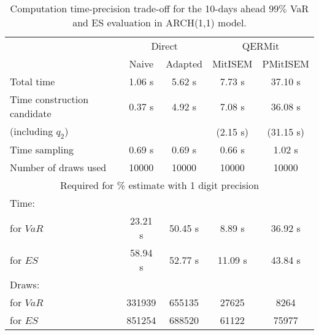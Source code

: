{ \renewcommand{\arraystretch}{1.3} 
\begin{table}[h] 
\centering 
\caption{Computation time-precision trade-off for the 10-days ahead  $99\%$ VaR and ES evaluation in ARCH(1,1) model.} 
\label{tab:time_precision_arch} 
\begin{tabular}{lcccc}  
  & \multicolumn{2}{c}{Direct} & \multicolumn{2}{c}{QERMit}  \\ \cline{2-5} 
  & Naive & Adapted & MitISEM & PMitISEM  \\ \hline 
Total time & 1.06 s & 5.62 s & 7.73 s & 37.10 s \\ 
Time construction candidate & 0.37 s & 4.92 s & 7.08 s & 36.08 s \\ 
 (including $q_{2}$) &   &  & (2.15 s) & (31.15 s) \\ 
Time sampling & 0.69 s & 0.69 s & 0.66 s & 1.02 s  \\  
Number of draws used & 10000 & 10000 & 10000 & 10000 \\ \hline 
\multicolumn{5}{c}{Required for \% estimate with 1 digit precision} \\ \hline 
Time: &  &  &   &  \\ 
\hspace{1cm} for $VaR$ & 23.21 s & 50.45 s & 8.89 s & 36.92 s \\ 
\hspace{1cm} for $ES$ & 58.94 s & 52.77 s & 11.09 s & 43.84 s \\ 
Draws: &  &  &   &  \\ 
\hspace{1cm} for $VaR$ & 331939 & 655135  &  27625  &   8264  \\ 
\hspace{1cm} for $ES$ & 851254 & 688520  &  61122   &  75977  \\ 
\hline 
\end{tabular} 
\end{table} 
} 
